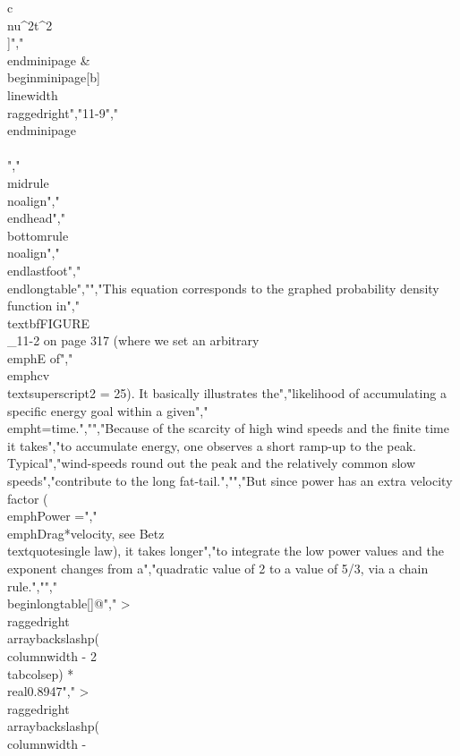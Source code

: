 {{{{{{{c\\nu^{2}}}{t^{2}}\\]","\\end{minipage} & \\begin{minipage}[b]{\\linewidth}\\raggedright","11-9","\\end{minipage} \\\\","\\midrule\\noalign{}","\\endhead","\\bottomrule\\noalign{}","\\endlastfoot","\\end{longtable}","","This equation corresponds to the graphed probability density function in","\\textbf{FIGURE\\_11-2 on page 317} (where we set an arbitrary \\emph{E} of","\\emph{cv} \\textsuperscript{2} = 25). It basically illustrates the","likelihood of accumulating a specific energy goal within a given","\\emph{t}=time.","","Because of the scarcity of high wind speeds and the finite time it takes","to accumulate energy, one observes a short ramp-up to the peak. Typical","wind-speeds round out the peak and the relatively common slow speeds","contribute to the long fat-tail.","","But since power has an extra velocity factor (\\emph{Power} =","\\emph{Drag*velocity}, see Betz\\textquotesingle{} law), it takes longer","to integrate the low power values and the exponent changes from a","quadratic value of 2 to a value of 5/3, via a chain rule.","","\\begin{longtable}[]{@{}","  >{\\raggedright\\arraybackslash}p{(\\columnwidth - 2\\tabcolsep) * \\real{0.8947}}","  >{\\raggedright\\arraybackslash}p{(\\columnwidth - }}}}}}}
